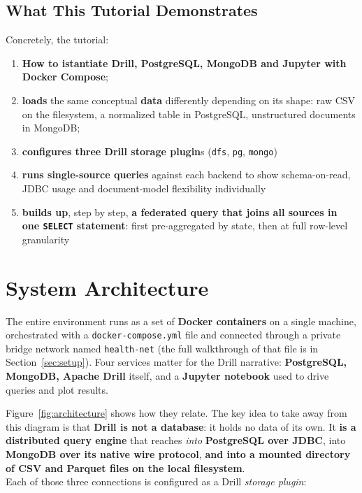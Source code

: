 \documentclass[11pt,a4paper]{article}
\begin{document}
\subsection{What This Tutorial Demonstrates}

Concretely, the tutorial: \begin{enumerate}
    \item \textbf{How to istantiate Drill, PostgreSQL, MongoDB and Jupyter with
Docker Compose};
\item \textbf{loads} the same conceptual \textbf{data} differently depending on its shape: raw CSV on the filesystem, a normalized table in PostgreSQL, unstructured documents in
MongoDB;
\item \textbf{configures three Drill storage plugin}s (\texttt{dfs}, \texttt{pg}, \texttt{mongo})
\item \textbf{runs single-source queries} against each backend to show
schema-on-read, JDBC usage and document-model flexibility individually
\item \textbf{builds up}, step by step, \textbf{a federated query that joins all sources in one
\texttt{SELECT} statement}:  first pre-aggregated by state, then at full row-level
granularity
\end{enumerate}


\section{System Architecture}
\label{sec:architecture}

The entire environment runs as a set of \textbf{Docker containers} on a single machine,
orchestrated with a \texttt{docker-compose.yml} file and connected through a private
bridge network named \texttt{health-net} (the full walkthrough of that file is in
Section~\ref{sec:setup}).
Four services matter for the Drill narrative:\textbf{ PostgreSQL, MongoDB, Apache Drill} itself, and a \textbf{Jupyter notebook }used to drive queries and plot results.

Figure~\ref{fig:architecture} shows how they relate. The key idea to take away from
this diagram is that \textbf{Drill is not a database}: it holds no data of its own.
It \textbf{is a distributed query engine} that reaches \emph{into} \textbf{PostgreSQL over JDBC}, into
\textbf{MongoDB over its native wire protocol}, \textbf{and into a mounted directory of CSV and
Parquet files on the local filesystem}. \\
Each of those three connections is configured
as a Drill \emph{storage plugin}:
\end{document}
